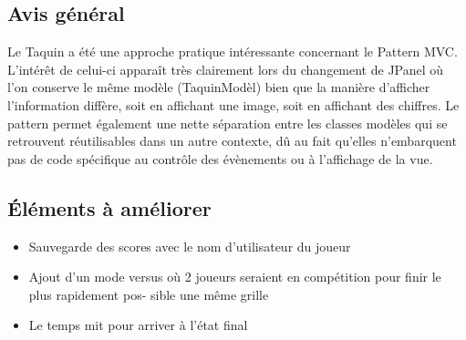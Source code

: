 \documentclass[12pt]{article}
\begin{document}
\subsection{Avis général}
Le Taquin a été une approche pratique intéressante concernant le Pattern MVC. L’intérêt de celui-ci
apparaît très clairement lors du changement de JPanel où l’on conserve le même modèle (TaquinModèl)
bien que la manière d’afficher l’information diffère, soit en affichant une image, soit en affichant des
chiffres. Le pattern permet également une nette séparation entre les classes modèles qui se retrouvent
réutilisables dans un autre contexte, dû au fait qu’elles n’embarquent pas de code spécifique au contrôle
des évènements ou à l’affichage de la vue.

\subsection{Éléments à améliorer}
\begin{itemize}
	\item Sauvegarde des scores avec le nom d’utilisateur du joueur
	\item Ajout d’un mode versus où 2 joueurs seraient en compétition pour finir le plus rapidement pos-
	sible une même grille
	\item Le temps mit pour arriver à l'état final
\end{itemize}
\end{document}
